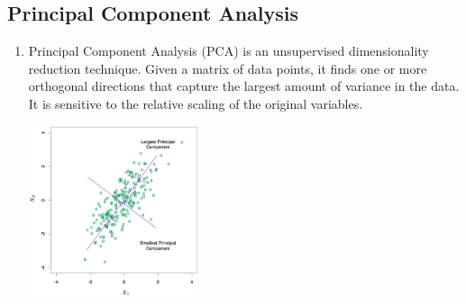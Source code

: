 \documentclass[10pt]{article}
\begin{document}
\begin{multicols}{2}
\begin{addmargin}[0.8em]{0.5em}
    \subsection{Principal Component Analysis}
    \begin{enumerate}[label=(\alph*)]
        \item Principal Component Analysis (PCA) is an unsupervised dimensionality reduction technique. Given a matrix of data points, it finds one or more orthogonal directions that capture the largest amount of variance in the data. It is sensitive to the relative scaling of the original variables.
        \begin{center}
            \includegraphics[width=5cm]{pca1.png}
        \end{center}

        

\end{enumerate}
\end{addmargin}
\end{multicols}
\end{document}
